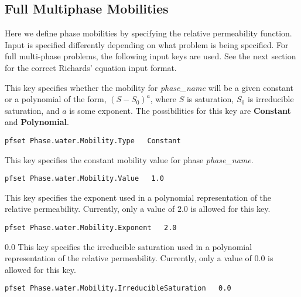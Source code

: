 
\subsection{Full Multiphase Mobilities}

Here we define phase mobilities by specifying the
relative permeability function.  Input is specified differently depending on
what problem is being specified.  For full multi-phase problems, the following
input keys are used.  See the next section for the correct Richards' equation
input format.

{
This key specifies whether the mobility for {\em phase\_name} will be a given
constant or a polynomial of the form,
$(S - S_0)^{a}$, where $S$ is saturation, $S_0$ is
irreducible saturation, and $a$ is some exponent.
The possibilities for this key are {\bf Constant} and {\bf Polynomial}.
}
\begin{display}\begin{verbatim}
pfset Phase.water.Mobility.Type   Constant
\end{verbatim}\end{display}

{
This key specifies the constant mobility value for phase {\em phase\_name}.
}
\begin{display}\begin{verbatim}
pfset Phase.water.Mobility.Value   1.0
\end{verbatim}\end{display}

{
This key specifies the exponent used in a polynomial representation of the
relative permeability.  Currently, only a value of $2.0$ is allowed for this
key.
}
\begin{display}\begin{verbatim}
pfset Phase.water.Mobility.Exponent   2.0
\end{verbatim}\end{display}

{0.0}
{
This key specifies the irreducible saturation
used in a polynomial representation of the relative permeability.
Currently, only a value of 0.0 is allowed for this key.
}
\begin{display}\begin{verbatim}
pfset Phase.water.Mobility.IrreducibleSaturation   0.0
\end{verbatim}\end{display}


